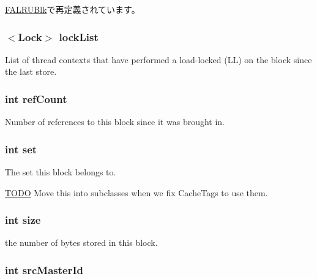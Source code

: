 \hyperlink{classFALRUBlk_a0d3f1758bf7fdcec892f211bf3553d4f}{FALRUBlk}で再定義されています。\hypertarget{classCacheBlk_a7e5fa7f4cd7e9dfee57c929c162daf0b}{
\subsubsection[{lockList}]{$<${\bf Lock}$>$ {\bf lockList}}}
\label{classCacheBlk_a7e5fa7f4cd7e9dfee57c929c162daf0b}
List of thread contexts that have performed a load-\/locked (LL) on the block since the last store. \hypertarget{classCacheBlk_a43ab0d8eafd71383b2233bdee65911de}{
\subsubsection[{refCount}]{\setlength{\rightskip}{0pt plus 5cm}int {\bf refCount}}}
\label{classCacheBlk_a43ab0d8eafd71383b2233bdee65911de}
Number of references to this block since it was brought in. \hypertarget{classCacheBlk_abc95fb2bad5b94ceca590f7dacd269b5}{
\subsubsection[{set}]{\setlength{\rightskip}{0pt plus 5cm}int {\bf set}}}
\label{classCacheBlk_abc95fb2bad5b94ceca590f7dacd269b5}
The set this block belongs to. \begin{Desc}
\item[\hyperlink{todo__todo000073}{TODO}]Move this into subclasses when we fix CacheTags to use them. \end{Desc}
\hypertarget{classCacheBlk_a439227feff9d7f55384e8780cfc2eb82}{
\subsubsection[{size}]{\setlength{\rightskip}{0pt plus 5cm}int {\bf size}}}
\label{classCacheBlk_a439227feff9d7f55384e8780cfc2eb82}
the number of bytes stored in this block. \hypertarget{classCacheBlk_ab4fab3e5850df5c3ff6cf55f1517a4ad}{
\subsubsection[{srcMasterId}]{\setlength{\rightskip}{0pt plus 5cm}int {\bf srcMasterId}}}

